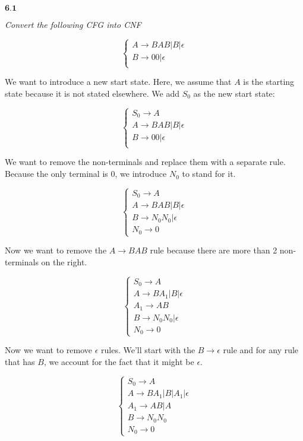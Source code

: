 \documentclass{article}
\newcommand{\problem}[1]{$\boxed{\textbf{#1}}$}
\begin{document}
\problem{6.1}

\textit{Convert the following CFG into CNF}

\[\begin{cases}
A\rightarrow BAB | B | \epsilon \\
B\rightarrow 00 | \epsilon \\
\end{cases}\]

We want to introduce a new start state. Here, we assume that $A$ is
the starting state because it is not stated elsewhere. We add $S_0$ as
the new start state:

\[\begin{cases}
S_0\rightarrow A \\
A\rightarrow BAB | B | \epsilon \\
B\rightarrow 00 | \epsilon \\
\end{cases}\]

We want to remove the non-terminals and replace them with a separate
rule. Because the only terminal is $0$, we introduce $N_0$ to stand
for it.

\[\begin{cases}
S_0\rightarrow A \\
A\rightarrow BAB | B | \epsilon \\
B\rightarrow N_0 N_0 | \epsilon \\
N_0\rightarrow 0
\end{cases}\]

Now we want to remove the $A\rightarrow{}BAB$ rule because there are
more than 2 non-terminals on the right.

\[\begin{cases}
S_0\rightarrow A \\
A\rightarrow BA_1 | B | \epsilon \\
A_1\rightarrow AB \\
B\rightarrow N_0 N_0 | \epsilon \\
N_0\rightarrow 0
\end{cases}\]

Now we want to remove $\epsilon$ rules. We'll start with the
$B\rightarrow\epsilon$ rule and for any rule that has $B$, we account
for the fact that it might be $\epsilon$.

\[\begin{cases}
S_0\rightarrow A \\
A\rightarrow BA_1 | B | A_1 | \epsilon \\
A_1\rightarrow AB | A \\
B\rightarrow N_0 N_0  \\
N_0\rightarrow 0
\end{cases}\]
\end{document}
